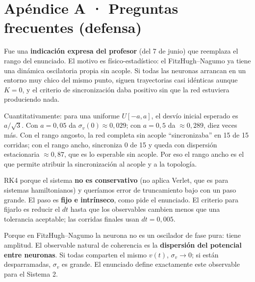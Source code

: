 \documentclass[11pt]{article}
\begin{document}
\section*{Apéndice A · Preguntas frecuentes (defensa)}

\begin{tcolorbox}[colback=white,colframe=ianColor,title=\textbf{¿Por qué cambiaron las condiciones iniciales si el enunciado decía $[-0{,}05;\,0{,}05]$?} (Ian)]
\small
Fue una \textbf{indicación expresa del profesor} (del 7 de junio) que reemplaza el rango del enunciado. El motivo es físico-estadístico: el FitzHugh--Nagumo ya tiene una dinámica oscilatoria propia sin acople. Si todas las neuronas arrancan en un entorno muy chico del mismo punto, siguen trayectorias casi idénticas aunque $K=0$, y el criterio de sincronización daba positivo sin que la red estuviera produciendo nada.

Cuantitativamente: para una uniforme $U[-a,a]$, el desvío inicial esperado es $a/\sqrt{3}$. Con $a=0{,}05$ da $\sigma_v(0)\approx 0{,}029$; con $a=0{,}5$ da $\approx 0{,}289$, diez veces más. Con el rango angosto, la red completa sin acople ``sincronizaba'' en 15 de 15 corridas; con el rango ancho, sincroniza 0 de 15 y queda con dispersión estacionaria $\approx 0{,}87$, que es lo esperable sin acople. Por eso el rango ancho es el que permite atribuir la sincronización al acople y a la topología.
\end{tcolorbox}

\begin{tcolorbox}[colback=white,colframe=keoColor,title=\textbf{¿Por qué RK4 y no Euler / Verlet? ¿Cómo eligieron el dt?} (Keo)]
\small
RK4 porque el sistema \textbf{no es conservativo} (no aplica Verlet, que es para sistemas hamiltonianos) y queríamos error de truncamiento bajo con un paso grande. El paso es \textbf{fijo e intrínseco}, como pide el enunciado. El criterio para fijarlo es reducir el $dt$ hasta que los observables cambien menos que una tolerancia aceptable; las corridas finales usan $dt = 0{,}005$.
\end{tcolorbox}

\begin{tcolorbox}[colback=white,colframe=nicoColor,title=\textbf{¿Por qué $\sigma_v$ y no el parámetro de orden de Kuramoto?} (Nico)]
\small Porque en FitzHugh--Nagumo la neurona no es un oscilador de fase pura: tiene amplitud. El observable natural de coherencia es la \textbf{dispersión del potencial entre neuronas}. Si todas comparten el mismo $v(t)$, $\sigma_v\to 0$; si están desparramadas, $\sigma_v$ es grande. El enunciado define exactamente este observable para el Sistema 2.
\end{tcolorbox}
\end{document}
